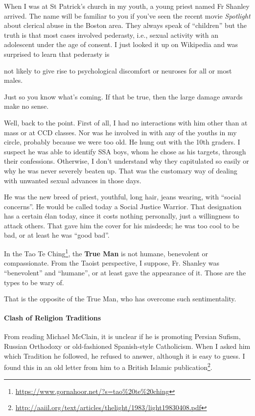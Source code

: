 When I was at St Patrick's church in my youth, a young priest named Fr Shanley arrived. The name will be familiar to you if you've seen the recent movie \emph{Spotlight} about clerical abuse in the Boston area. They always speak of ``children'' but the truth is that most cases involved pederasty, i.e., sexual activity with an adolescent under the age of consent. I just looked it up on Wikipedia and was surprised to learn that pederasty is

\begin{quotex}
not likely to give rise to psychological discomfort or neuroses for all or most males.
\end{quotex}


Just so you know what's coming. If that be true, then the large damage awards make no sense.

Well, back to the point. First of all, I had no interactions with him other than at mass or at CCD classes. Nor was he involved in with any of the youths in my circle, probably because we were too old. He hung out with the 10th graders. I suspect he was able to identify SSA boys, whom he chose as his targets, through their confessions. Otherwise, I don't understand why they capitulated so easily or why he was never severely beaten up. That was the customary way of dealing with unwanted sexual advances in those days.

He was the new breed of priest, youthful, long hair, jeans wearing, with ``social concerns''. He would be called today a Social Justice Warrior. That designation has a certain élan today, since it costs nothing personally, just a willingness to attack others. That gave him the cover for his misdeeds; he was too cool to be bad, or at least he was ``good bad''.

In the Tao Te Ching\footnote{\url{https://www.gornahoor.net/?s=tao\%20te\%20ching}}, the \textbf{True Man} is not humane, benevolent or compassionate. From the Taoist perspective, I suppose, Fr. Shanley was ``benevolent'' and ``humane'', or at least gave the appearance of it. Those are the types to be wary of.

That is the opposite of the True Man, who has overcome such sentimentality.

\paragraph{Clash of Religion Traditions}


From reading Michael McClain, it is unclear if he is promoting Persian Sufism, Russian Orthodoxy or old-fashioned Spanish-style Catholicism. When I asked him which Tradition he followed, he refused to answer, although it is easy to guess. I found this in an old letter from him to a British Islamic publication\footnote{\url{http://aaiil.org/text/articles/thelight/1983/light19830408.pdf}}.

